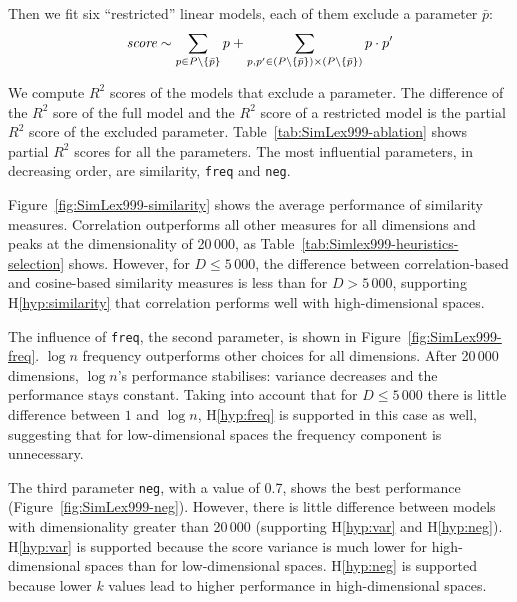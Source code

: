 Then we fit six ``restricted'' linear models, each of them exclude a parameter $\bar p$:
\begin{equation}
  \text{\it score} \sim \sum_{p \in P \setminus \{\bar p\} }p + \sum_{p, p' \in (P \setminus \{\bar p\}) \times (P \setminus \{\bar p\})}p \cdot p'
\end{equation}





We compute $R^2$ scores of the models that exclude a parameter. The difference of the $R^2$ sore of the full model and the $R^2$ score of a restricted model is the partial $R^2$ score of the excluded parameter. Table~\ref{tab:SimLex999-ablation} shows partial $R^2$ scores for all the parameters. The most influential parameters, in decreasing order, are similarity, \texttt{freq} and \texttt{neg}.


Figure~\ref{fig:SimLex999-similarity} shows the average performance of similarity measures. Correlation outperforms all other measures for all dimensions and peaks at the dimensionality  of 20\,000, as Table~\ref{tab:Simlex999-heuristics-selection} shows. However, for $D \leq 5\,000$, the difference between correlation-based and cosine-based similarity measures is less than for $D > 5\,000$, supporting H\ref{hyp:similarity} that correlation performs well with high-dimensional spaces.

The influence of \texttt{freq}, the second parameter, is shown in Figure~\ref{fig:SimLex999-freq}. $\log n$ frequency outperforms other choices for all dimensions. After 20\,000 dimensions, $\log n$'s performance stabilises: variance decreases and the performance stays constant. Taking into account that for $D \leq 5\,000$ there is little difference between $1$ and $\log n$, H\ref{hyp:freq} is supported in this case as well, suggesting that for low-dimensional spaces the frequency component is unnecessary.


The third parameter \texttt{neg}, with a value of 0.7, shows the best performance (Figure~\ref{fig:SimLex999-neg}). However, there is little difference between models with dimensionality greater than 20\,000 (supporting H\ref{hyp:var} and H\ref{hyp:neg}). H\ref{hyp:var} is supported because the score variance is much lower for high-dimensional spaces than for low-dimensional spaces. H\ref{hyp:neg} is supported because lower $k$ values lead to higher performance in high-dimensional spaces.

